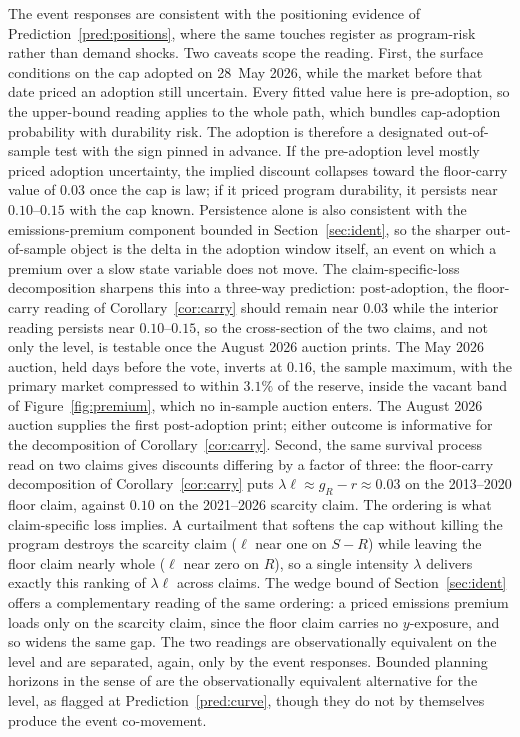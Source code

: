 \documentclass[11pt,letterpaper]{article}
\theoremstyle{plain}
\theoremstyle{definition}
\numberwithin{equation}{section}
\begin{document}
The event responses are consistent with the positioning evidence of Prediction~\ref{pred:positions}, where the same touches register as program-risk rather than demand shocks. Two caveats scope the reading. First, the surface conditions on the cap adopted on 28~May 2026, while the market before that date priced an adoption still uncertain. Every fitted value here is pre-adoption, so the upper-bound reading applies to the whole path, which bundles cap-adoption probability with durability risk. The adoption is therefore a designated out-of-sample test with the sign pinned in advance. If the pre-adoption level mostly priced adoption uncertainty, the implied discount collapses toward the floor-carry value of $0.03$ once the cap is law; if it priced program durability, it persists near $0.10$--$0.15$ with the cap known. Persistence alone is also consistent with the emissions-premium component bounded in Section~\ref{sec:ident}, so the sharper out-of-sample object is the delta in the adoption window itself, an event on which a premium over a slow state variable does not move. The claim-specific-loss decomposition sharpens this into a three-way prediction: post-adoption, the floor-carry reading of Corollary~\ref{cor:carry} should remain near $0.03$ while the interior reading persists near $0.10$--$0.15$, so the cross-section of the two claims, and not only the level, is testable once the August 2026 auction prints. The May 2026 auction, held days before the vote, inverts at $0.16$, the sample maximum, with the primary market compressed to within $3.1\%$ of the reserve, inside the vacant band of Figure~\ref{fig:premium}, which no in-sample auction enters. The August 2026 auction supplies the first post-adoption print; either outcome is informative for the decomposition of Corollary~\ref{cor:carry}. Second, the same survival process read on two claims gives discounts differing by a factor of three: the floor-carry decomposition of Corollary~\ref{cor:carry} puts $\lambda\ell\approx g_R-r\approx0.03$ on the 2013--2020 floor claim, against $0.10$ on the 2021--2026 scarcity claim. The ordering is what claim-specific loss implies. A curtailment that softens the cap without killing the program destroys the scarcity claim ($\ell$ near one on $S-R$) while leaving the floor claim nearly whole ($\ell$ near zero on $R$), so a single intensity $\lambda$ delivers exactly this ranking of $\lambda\ell$ across claims. The wedge bound of Section~\ref{sec:ident} offers a complementary reading of the same ordering: a priced emissions premium loads only on the scarcity claim, since the floor claim carries no $y$-exposure, and so widens the same gap. The two readings are observationally equivalent on the level and are separated, again, only by the event responses. Bounded planning horizons in the sense of \citet{quemin2021} are the observationally equivalent alternative for the level, as flagged at Prediction~\ref{pred:curve}, though they do not by themselves produce the event co-movement.
\end{document}
